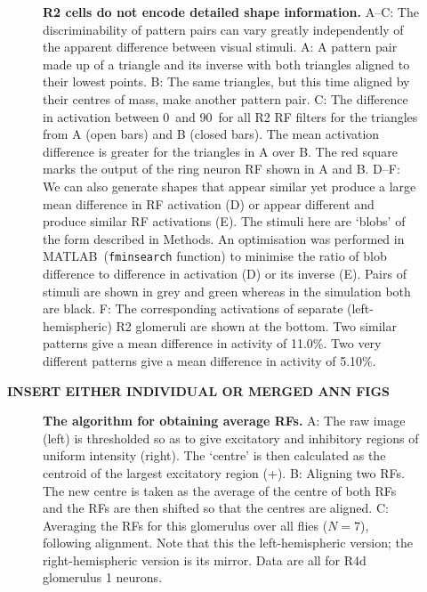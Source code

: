 \documentclass[10pt]{article}
\newcommand{\Matlab}{MATLAB}
\begin{document}
\begin{figure}
	\caption{
		{\bf R2 cells do not encode detailed shape information.}
		A--C: The discriminability of pattern pairs can vary greatly independently of the apparent difference between visual stimuli. A: A pattern pair made up of a triangle and its inverse with both triangles aligned to their lowest points. B: The same triangles, but this time aligned by their centres of mass, make another pattern pair. C: The difference in activation between 0\degree\ and 90\degree\ for all R2 RF filters for the triangles from A (open bars) and B (closed bars). The mean activation difference is greater for the triangles in A over B. The red square marks the output of the ring neuron \ac{RF} shown in A and B. 
		D--F: We can also generate shapes that appear similar yet produce a large mean difference in RF activation (D) or appear different and produce similar RF activations (E). The stimuli here are `blobs' of the form described in Methods. An optimisation was performed in \Matlab\ (\texttt{fminsearch} function) to minimise the ratio of blob difference to difference in activation (D) or its inverse (E). Pairs of stimuli are shown in grey and green whereas in the simulation both are black.
		F: The corresponding activations of separate (left-hemispheric) R2 glomeruli are shown at the bottom. Two similar patterns give a mean difference in activity of 11.0\%. Two very different patterns give a mean difference in activity of 5.10\%.
		}
	\label{fig:simdiffpatts}
\end{figure}

{\bf INSERT EITHER INDIVIDUAL OR MERGED ANN FIGS }

\begin{figure}
	\caption{
		{\bf The algorithm for obtaining average RFs.}
		A: The raw image (left) is thresholded so as to give excitatory and inhibitory regions of uniform intensity (right).
		The `centre' is then calculated as the centroid of the largest excitatory region (+).
		B: Aligning two RFs.
		The new centre is taken as the average of the centre of both RFs and the RFs are then shifted so that the centres are aligned.
		C: Averaging the RFs for this glomerulus over all flies ($N=7$), following alignment.
		Note that this the left-hemispheric version; the right-hemispheric version is its mirror.
		Data are all for R4d glomerulus 1 neurons.
		}
	\label{fig:avkernels}
\end{figure}
\end{document}
